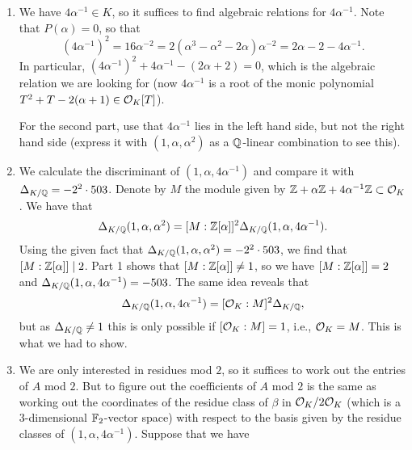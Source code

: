 \documentclass[a4paper,11pt]{article}
\begin{document}
\begin{enumerate}[labelindent=0pt, wide]
    \item We have $4\alpha^{-1} \in K$, so it suffices to find algebraic relations
        for $4\alpha^{-1}$.
        Note that $P(\alpha) = 0$, so that
        \begin{equation*}
            (4 \alpha^{-1})^2 = 16 \alpha^{-2} = 
            2(\alpha^3 - \alpha^2 - 2\alpha) \alpha^{-2} = 2\alpha - 2 -
            4 \alpha^{-1}.
        \end{equation*}
        In particular, $(4 \alpha^{-1})^2 + 4 \alpha^{-1} - (2\alpha +2) = 0$,
        which is the algebraic relation we are looking for (now
        $4\alpha^{-1}$ is a root of the monic polynomial 
        $T^2 + T - 2(\alpha +1) \in \mathcal{O}_K[T]$).

        For the second part, use that $4\alpha^{-1}$ lies in the left hand
        side, but not the right hand side (express it with $(1, \alpha, \alpha^2)$
        as a $\mathbb{Q}$-linear combination to see this). 
    \item We calculate the discriminant of $(1, \alpha, 4\alpha^{-1})$ and
        compare it with $\Delta_{K/\mathbb{Q}} = -2^2\cdot 503$.
        Denote by $M$ the module given by $\mathbb{Z} + \alpha \mathbb{Z} + 4\alpha^{-1} \mathbb{Z}
        \subset \mathcal{O}_K$. We have that 
        $$\Delta_{K/\mathbb{Q}}(1, \alpha, \alpha^2) = [M:\mathbb{Z}[\alpha]]^2 \Delta_{K/\mathbb{Q}}(
        1, \alpha, 4\alpha^{-1}).$$
        Using the given fact that $\Delta_{K/\mathbb{Q}}(1, \alpha, \alpha^2) = 
        -2^2\cdot 503$, we find that $[M:\mathbb{Z}[\alpha]] \mid 2$. Part 1 shows that
        $[M:\mathbb{Z}[\alpha]] \neq 1$, so we have $[M:\mathbb{Z}[\alpha]] = 2$ and
        $\Delta_{K/\mathbb{Q}}(1, \alpha, 4\alpha^{-1}) = -503$.
        The same idea reveals that 
        \begin{equation*}
            \Delta_{K/\mathbb{Q}}(1, \alpha, 4\alpha^{-1}) = [\mathcal{O}_K:M]^2 \Delta_{K/\mathbb{Q}},
        \end{equation*}
        but as $\Delta_{K/\mathbb{Q}}\neq 1$ this is only possible if $[\mathcal{O}_K:M]=1$,
        i.e., $\mathcal{O}_K = M$. This is what we had to show.
    \item We are only interested in residues mod $2$, so it suffices to work out
        the entries of $A$ mod $2$. But to figure out the coefficients of $A$
        mod $2$ is the same as working out the coordinates of the residue class
        of $\beta$ in $\mathcal{O}_K/2\mathcal{O}_K$ (which is a $3$-dimensional $\mathbb{F}_2$-vector
        space) with respect to the basis given by the residue classes of 
        $(1, \alpha, 4\alpha^{-1})$.
        Suppose that we have

\end{enumerate}
\end{document}
